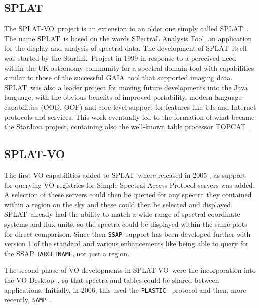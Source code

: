 \documentclass[final,authoryear,5p,times,twocolumn]{elsarticle}
\newcommand{\ssap}{\texttt{SSAP}}
\newcommand{\plastic}{\texttt{PLASTIC}}
\newcommand{\samp}{\texttt{SAMP}}
\newcommand{\splat}{\textsf{\small SPLAT}}
\newcommand{\splatvo}{{\textsf{\small{SPLAT-VO}}}}
\newcommand{\topcat}{\textsf{\small TOPCAT}}
\newcommand{\gaia}{\textsf{\small GAIA}}
\newcommand{\Starlink}{\textsf{\small Starlink}}
\newcommand{\vodesktop}{\textsf{\small VO-Desktop}}
\newcommand{\ascl}[1]{\href{http://www.ascl.net/#1}{ascl:#1}}
\begin{document}
\subsection{SPLAT}

The \splatvo\ project is an extension to an older one simply called
\splat\ \citep[][\ascl{1402.007}]{2002ASPC..281..513B}.  The name \splat\
is based on the words SPectraL Analysis Tool, an application for the
display and analysis of spectral data. The development of \splat\ itself
was started by the \Starlink\ Project \citep{1982QJRAS..23..485D} in
1999 in response to a perceived need within the UK astronomy community
for a spectral domain tool with capabilities similar to those of the
successful \gaia\ tool \citep[][\ascl{1403.024}]{2000ASPC..216..615D}
that supported imaging data. \splat\ was also a leader project for
moving future developments into the Java language, with the obvious
benefits of improved portability, modern language capabilities (OOD,
OOP) and core-level support for features like UIs and Internet
protocols and services. This work eventually led to the formation of
what became the StarJava project, containing also the well-known table processor \topcat\ \citep[][\ascl{1101.010}]{2005ASPC..347...29T}. 

\subsection{SPLAT-VO}

The first VO capabilities added to \splat\ where released in 2005
\citep{2005ASPC..347...22D}, as support for querying VO registries for Simple
Spectral Access Protocol servers was added. A selection of these servers could
then be queried for any spectra they contained within a region on the sky and
these could then be selected and displayed. \splat\ already had the ability to
match a wide range of spectral coordinate systems and flux units, so the
spectra could be displayed within the same plots for direct comparison. Since
then \ssap\ support has been developed further with version 1 of the standard
and various enhancements like being able to query for the SSAP
\texttt{TARGETNAME}, not just a region.

The second phase of VO developments in \splatvo\ were the incorporation
into the \vodesktop\ \citep{2008ASPC..394..251W}, so that spectra and tables could be shared
between applications.  Initially, in 2006, this used the \plastic\
\citep{2007ASPC..376..511T} protocol and then, more recently, \samp\
\citep{2012ASPC..461..279T}.
\end{document}
